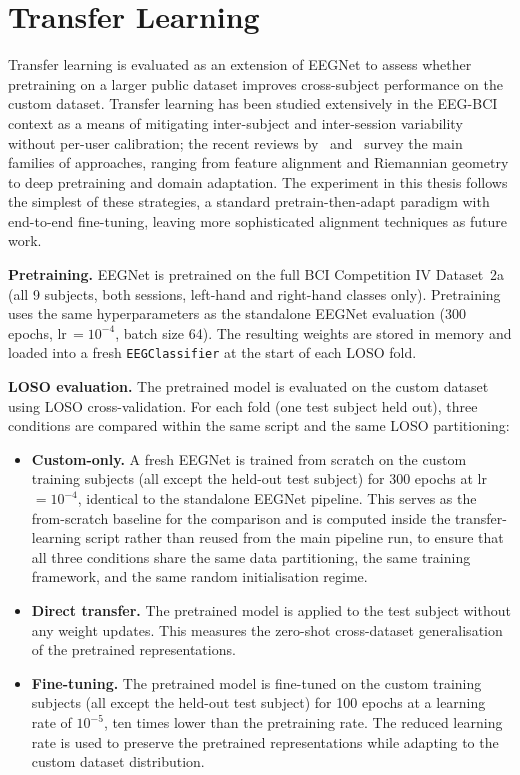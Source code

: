 \documentclass[english, bc, kiv, he, iso690alph, pdf]{fasthesis}
\begin{document}
\section{Transfer Learning}
\label{sec:methods_tl}

Transfer learning is evaluated as an extension of EEGNet to assess whether pretraining on a larger public dataset improves cross-subject performance on the custom dataset. Transfer learning has been studied extensively in the EEG-BCI context as a means of mitigating inter-subject and inter-session variability without per-user calibration; the recent reviews by~\cite{wu2022transfer} and~\cite{wan2021review} survey the main families of approaches, ranging from feature alignment and Riemannian geometry to deep pretraining and domain adaptation. The experiment in this thesis follows the simplest of these strategies, a standard pretrain-then-adapt paradigm with end-to-end fine-tuning, leaving more sophisticated alignment techniques as future work.

\textbf{Pretraining.} EEGNet is pretrained on the full BCI Competition IV Dataset~2a (all 9 subjects, both sessions, left-hand and right-hand classes only). Pretraining uses the same hyperparameters as the standalone EEGNet evaluation (300 epochs, lr\,$= 10^{-4}$, batch size 64). The resulting weights are stored in memory and loaded into a fresh \texttt{EEGClassifier} at the start of each LOSO fold.

\textbf{LOSO evaluation.} The pretrained model is evaluated on the custom dataset using LOSO cross-validation. For each fold (one test subject held out), three conditions are compared within the same script and the same LOSO partitioning:

\begin{itemize}
    \item \textbf{Custom-only.} A fresh EEGNet is trained from scratch on the custom training subjects (all except the held-out test subject) for 300 epochs at lr\,$=10^{-4}$, identical to the standalone EEGNet pipeline. This serves as the from-scratch baseline for the comparison and is computed inside the transfer-learning script rather than reused from the main pipeline run, to ensure that all three conditions share the same data partitioning, the same training framework, and the same random initialisation regime.
    \item \textbf{Direct transfer.} The pretrained model is applied to the test subject without any weight updates. This measures the zero-shot cross-dataset generalisation of the pretrained representations.
    \item \textbf{Fine-tuning.} The pretrained model is fine-tuned on the custom training subjects (all except the held-out test subject) for 100 epochs at a learning rate of $10^{-5}$, ten times lower than the pretraining rate. The reduced learning rate is used to preserve the pretrained representations while adapting to the custom dataset distribution.
\end{itemize}
\end{document}
